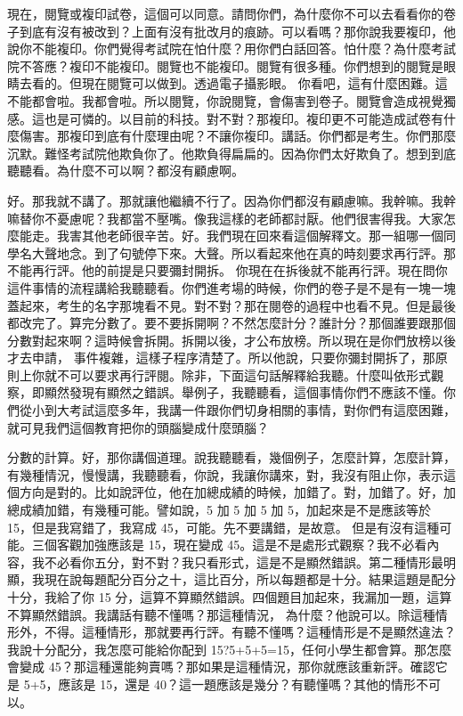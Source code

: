 \hypertarget{c08:cue:148}{}現在，閱覽或複印試卷，這個可以同意。請問你們，為什麼你不可以去看看你的卷子到底有沒有被改到？上面有沒有批改月的痕跡。可以看嗎？那你說我要複印，他說你不能複印。你們覺得考試院在怕什麼？用你們白話回答。怕什麼？為什麼考試院不答應？複印不能複印。閱覽也不能複印。閱覽有很多種。你們想到的閱覽是眼睛去看的。但現在閱覽可以做到。透過電子攝影眼。
\hypertarget{c08:cue:149}{}你看吧，這有什麼困難。這不能都會啦。我都會啦。所以閱覽，你說閱覽，會傷害到卷子。閱覽會造成視覺獨感。這也是可憐的。以目前的科技。對不對？那複印。複印更不可能造成試卷有什麼傷害。那複印到底有什麼理由呢？不讓你複印。講話。你們都是考生。你們那麼沉默。難怪考試院他欺負你了。他欺負得扁扁的。因為你們太好欺負了。想到到底聽聽看。為什麼不可以啊？都沒有顧慮啊。

\hypertarget{c08:cue:150}{}好。那我就不講了。那就讓他繼續不行了。因為你們都沒有顧慮嘛。我幹嘛。我幹嘛替你不憂慮呢？我都當不壓嘴。像我這樣的老師都討厭。他們很害得我。大家怎麼能走。我害其他老師很辛苦。好。我們現在回來看這個解釋文。那一組哪一個同學名大聲地念。到了句號停下來。大聲。所以看起來他在真的時刻要求再行評。那不能再行評。他的前提是只要彌封開拆。
\hypertarget{c08:cue:151}{}你現在在拆後就不能再行評。現在問你這件事情的流程講給我聽聽看。你們進考場的時候，你們的卷子是不是有一塊一塊蓋起來，考生的名字那塊看不見。對不對？那在閱卷的過程中也看不見。但是最後都改完了。算完分數了。要不要拆開啊？不然怎麼計分？誰計分？那個誰要跟那個分數對起來啊？這時候會拆開。拆開以後，才公布放榜。所以現在是你們放榜以後才去申請，
\hypertarget{c08:cue:152}{}事件複雜，這樣子程序清楚了。所以他說，只要你彌封開拆了，那原則上你就不可以要求再行評閱。除非，下面這句話解釋給我聽。什麼叫依形式觀察，即顯然發現有顯然之錯誤。舉例子，我聽聽看，這個事情你們不應該不懂。你們從小到大考試這麼多年，我講一件跟你們切身相關的事情，對你們有這麼困難，就可見我們這個教育把你的頭腦變成什麼頭腦？

\hypertarget{c08:cue:153}{}分數的計算。好，那你講個道理。說我聽聽看，幾個例子，怎麼計算，怎麼計算，有幾種情況，慢慢講，我聽聽看，你說，我讓你講來，對，我沒有阻止你，表示這個方向是對的。比如說評位，他在加總成績的時候，加錯了。對，加錯了。好，加總成績加錯，有幾種可能。譬如說，5 加 5 加 5 加 5，加起來是不是應該等於 15，但是我寫錯了，我寫成 45，可能。先不要講錯，是故意。
\hypertarget{c08:cue:154}{}但是有沒有這種可能。三個客觀加強應該是 15，現在變成 45。這是不是處形式觀察？我不必看內容，我不必看你五分，對不對？我只看形式，這是不是顯然錯誤。第二種情形最明顯，我現在說每題配分百分之十，這比百分，所以每題都是十分。結果這題是配分十分，我給了你 15 分，這算不算顯然錯誤。四個題目加起來，我漏加一題，這算不算顯然錯誤。我講話有聽不懂嗎？那這種情況，
\hypertarget{c08:cue:155}{}為什麼？他說可以。除這種情形外，不得。這種情形，那就要再行評。有聽不懂嗎？這種情形是不是顯然違法？我說十分配分，我怎麼可能給你配到 15?5+5+5=15，任何小學生都會算。那怎麼會變成 45？那這種還能夠賣嗎？那如果是這種情況，那你就應該重新評。確認它是 5+5，應該是 15，還是 40？這一題應該是幾分？有聽懂嗎？其他的情形不可以。

